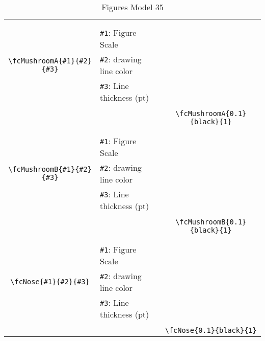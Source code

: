 \documentclass[x11names]{article}
\begin{document}
\begin{table}[H]
\begin{tabular}{|c|l|c|}
	&&\multirow{5}{*}{\fcMushroomA{0.1}{black}{1}}\\	&&\\	&\verb|#1|: Figure Scale &\\	\verb|\fcMushroomA{#1}{#2}{#3}|&	\verb|#2|: drawing line color &\\	&\verb|#3|: Line thickness (pt) &\\ &&\\&&	\verb|\fcMushroomA{0.1}{black}{1}|\\\hline 	
	&&\multirow{5}{*}{\fcMushroomB{0.1}{black}{1}}\\	&&\\	&\verb|#1|: Figure Scale &\\	\verb|\fcMushroomB{#1}{#2}{#3}|&	\verb|#2|: drawing line color &\\	&\verb|#3|: Line thickness (pt) &\\ &&\\&&	\verb|\fcMushroomB{0.1}{black}{1}|\\\hline 	
	&&\multirow{5}{*}{\fcNose{0.1}{black}{1}}\\	&&\\	&\verb|#1|: Figure Scale &\\	\verb|\fcNose{#1}{#2}{#3}|&	\verb|#2|: drawing line color &\\	&\verb|#3|: Line thickness (pt) &\\ &&\\&&	\verb|\fcNose{0.1}{black}{1}|\\\hline 	\hline\end{tabular}\caption{Figures Model 35}\label{tab35}\end{table}
\end{document}
